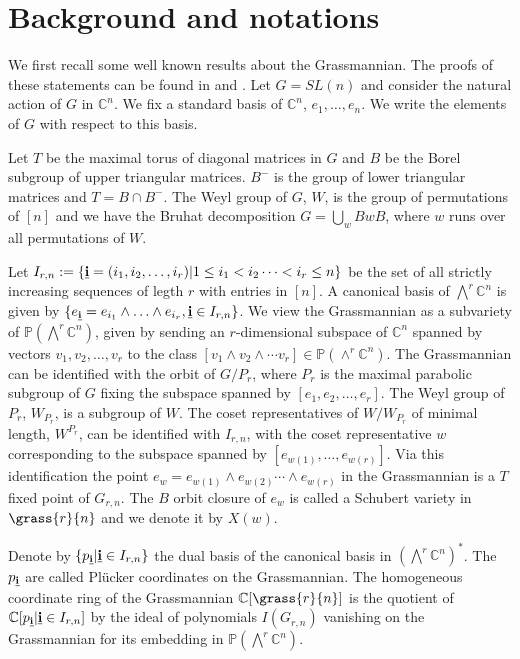 
   \section{Background and notations}
   \label{sec:notations}

We first recall some well known results about the Grassmannian.  The proofs of these statements can be found in \cite{lakshmibai2007standard} and \cite{seshadriintroduction}. Let $G=SL(n)$ and consider the
natural action of $G$ in ${\mathbb C}^n$. We fix a standard basis of ${\mathbb C}^n$, $e_1,\ldots,e_n$. We write the elements of $G$ with respect to this basis. 

Let $T$ be the maximal torus of diagonal matrices in $G$ and $B$ be the Borel subgroup of upper triangular matrices. $B^{-}$ is the group of lower triangular matrices and $T = B \cap B^{-}$. The Weyl group of $G$, $W$, is the group of permutations of $[n]$ and we have the Bruhat decomposition $G = \bigcup_w BwB$, where $w$ runs over all permutations of $W$.

Let $I_{r,n}:=\{{\bf \underline{i}} =(i_1,i_2,\ldots,i_r) |  1\leq i_1 < i_2 \cdots < i_r \leq n \}$ be the set of all strictly increasing sequences of legth $r$ with entries in $[n]$. 
 A canonical basis of $\bigwedge^r{\mathbb C}^n$ is given by $\{e_{\bf \underline{i}} = e_{i_1} \wedge \ldots \wedge e_{i_r}, {\bf \underline{i}} \in I_{r,n}\}$. 
 We view the Grassmannian as a subvariety of ${\mathbb P}(\bigwedge^r {\mathbb C}^n)$,
given by sending an $r$-dimensional
subspace of ${\mathbb C}^n$ spanned by vectors $v_1,v_2,\ldots,v_r$ to the class $[v_1 \wedge v_2 \wedge \cdots v_r] \in {\mathbb P}(\wedge^r {\mathbb C}^n)$.  The Grassmannian can be identified with the orbit of $G/P_{r}$, where $P_{r}$ is the maximal parabolic subgroup of $G$ fixing the subspace spanned by $[e_1,e_2, \ldots,e_r]$. The Weyl group of $P_{r}$, $W_{P_r}$, is a subgroup of $W$. The coset representatives of $W/W_{P_r}$  of minimal length, $W^{P_r}$, can be identified with $I_{r,n}$, with the coset representative $w$ corresponding to the subspace spanned by $[e_{w(1)},\ldots,e_{w(r)}]$. Via this identification the point
$e_w = e_{w(1)} \wedge e_{w(2)} \cdots \wedge e_{w(r)}$ in the Grassmannian is a $T$ fixed point of $G_{r,n}$. The $B$ orbit closure of $e_{w}$ is called a Schubert variety in $\grass{r}{n}$ and we denote it
by $X(w)$.   

Denote by $\{p_{\bf \underline{i}} | {\bf \underline{i}} \in I_{r,n}\}$ the dual basis of the canonical basis in  $(\bigwedge^r{\mathbb C}^n)^*$. The $p_{\bf \underline{i}}$ are called Pl\"{u}cker coordinates on the
 Grassmannian. The homogeneous coordinate ring of the Grassmannian ${\mathbb C}[\grass{r}{n}]$ is the quotient of ${\mathbb C}[p_{\bf \underline{i}} | {\bf \underline{i}} \in I_{r,n}]$ by the ideal of polynomials 
 $I(G_{r,n})$ vanishing on the Grassmannian for its embedding in ${\mathbb P}(\bigwedge^r{\mathbb C}^n)$.  
 
